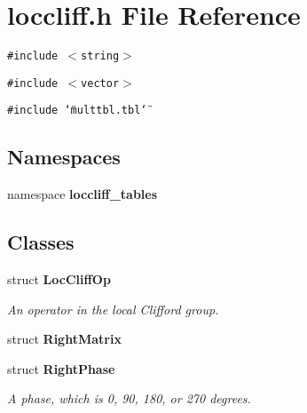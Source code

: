 \section{loccliff.h File Reference}
\label{loccliff_8h}
{\tt \#include $<$string$>$}\par
{\tt \#include $<$vector$>$}\par
{\tt \#include \char`\"{}multtbl.tbl\char`\"{}}\par
\subsection*{Namespaces}
\begin{CompactItemize}
\item 
namespace {\bf loccliff\_\-tables}
\end{CompactItemize}
\subsection*{Classes}
\begin{CompactItemize}
\item 
struct {\bf Loc\-Cliff\-Op}
\begin{CompactList}\small\item\em An operator in the local Clifford group. \item\end{CompactList}\item 
struct {\bf Right\-Matrix}
\item 
struct {\bf Right\-Phase}
\begin{CompactList}\small\item\em A phase, which is 0, 90, 180, or 270 degrees. \item\end{CompactList}\end{CompactItemize}

